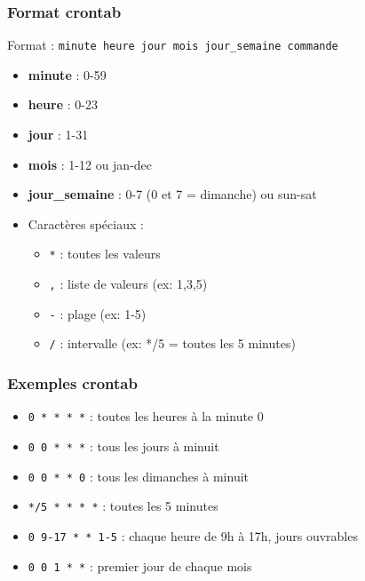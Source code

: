 \documentclass[12pt,a4paper]{article}
\begin{document}
\subsubsection{Format crontab}
Format : \texttt{minute heure jour mois jour\_semaine commande}
\begin{itemize}
    \item \textbf{minute} : 0-59 %
    \item \textbf{heure} : 0-23 %
    \item \textbf{jour} : 1-31 %
    \item \textbf{mois} : 1-12 ou jan-dec %
    \item \textbf{jour\_semaine} : 0-7 (0 et 7 = dimanche) ou sun-sat %
    \item Caract\`eres sp\'eciaux :
    \begin{itemize}
        \item \texttt{*} : toutes les valeurs %
        \item \texttt{,} : liste de valeurs (ex: 1,3,5) %
        \item \texttt{-} : plage (ex: 1-5) %
        \item \texttt{/} : intervalle (ex: */5 = toutes les 5 minutes) %
    \end{itemize}
\end{itemize}

\subsubsection{Exemples crontab}
\begin{itemize}
    \item \texttt{0 * * * *} : toutes les heures \`a la minute 0 %
    \item \texttt{0 0 * * *} : tous les jours \`a minuit %
    \item \texttt{0 0 * * 0} : tous les dimanches \`a minuit %
    \item \texttt{*/5 * * * *} : toutes les 5 minutes %
    \item \texttt{0 9-17 * * 1-5} : chaque heure de 9h \`a 17h, jours ouvrables %
    \item \texttt{0 0 1 * *} : premier jour de chaque mois %
\end{itemize}
\end{document}
